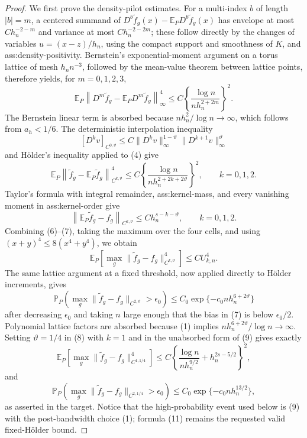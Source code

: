 \documentclass{article}
\begin{document}
\begin{proof}
We first prove the density-pilot estimates.  For a multi-index \(b\) of length \(|b|=m\), a centered summand of
\(D^b\widetilde f_g(x)-\mathbb E_PD^b\widetilde f_g(x)\) has envelope at most
\(C h_n^{-2-m}\) and variance at most \(C h_n^{-2-2m}\); these follow directly by the changes of variables
\(u=(x-z)/h_n\), using the compact support and smoothness of \(K\), and ass:density-positivity.  Bernstein's exponential-moment argument on a torus lattice of mesh \(h_n n^{-3}\), followed by the mean-value theorem between lattice points, therefore yields, for \(m=0,1,2,3\),
\[
 \mathbb E_P\left\|D^m\widetilde f_g-
       \mathbb E_PD^m\widetilde f_g\right\|_\infty^4
 \leq C\left\{\frac{\log n}{n h_n^{2+2m}}\right\}^{2}.
\tag{4}
\]
The Bernstein linear term is absorbed because
\(n h_n^2/\log n\to\infty\), which follows from \(a_h<1/6\).  The deterministic interpolation inequality
\[
 [D^k v]_{C^{0,\vartheta}}
 \leq C\|D^k v\|_\infty^{1-\vartheta}
          \|D^{k+1}v\|_\infty^{\vartheta}
\tag{5}
\]
and H\"older's inequality applied to (4) give
\[
 \mathbb E_P\left\|\widetilde f_g-\mathbb E_P\widetilde f_g
                   \right\|_{C^{k,\vartheta}}^4
 \leq C\left\{\frac{\log n}
 {n h_n^{2+2k+2\vartheta}}\right\}^{2},
 \qquad k=0,1,2.
\tag{6}
\]
Taylor's formula with integral remainder, ass:kernel-mass, and every vanishing moment in ass:kernel-order give
\[
 \left\|\mathbb E_P\widetilde f_g-f_g\right\|_{C^{k,\vartheta}}
 \leq C h_n^{s-k-\vartheta},
 \qquad k=0,1,2.
\tag{7}
\]
Combining (6)--(7), taking the maximum over the four cells, and using
\((x+y)^4\leq8(x^4+y^4)\), we obtain
\[
 \mathbb E_P\left[\max_g
 \|\widetilde f_g-f_g\|_{C^{k,\vartheta}}^4\right]
 \leq C U_{k,n}^4.
\tag{8}
\]
The same lattice argument at a fixed threshold, now applied directly to H\"older increments, gives
\[
 \mathbb P_P\left(\max_g
 \|\widetilde f_g-f_g\|_{C^{2,\vartheta}}>\epsilon_0\right)
 \leq C_0\exp\{-c_0n h_n^{6+2\vartheta}\}
\tag{9}
\]
after decreasing \(\epsilon_0\) and taking \(n\) large enough that the bias in (7) is below \(\epsilon_0/2\).  Polynomial lattice factors are absorbed because (1) implies
\(n h_n^{6+2\vartheta}/\log n\to\infty\).  Setting \(\vartheta=1/4\) in (8) with \(k=1\) and in the unabsorbed form of (9) gives exactly
\[
 \mathbb E_P\left[\max_g
 \|\widetilde f_g-f_g\|_{C^{1,1/4}}^4\right]
 \leq C\left\{\frac{\log n}{n h_n^{9/2}}
                  +h_n^{2s-5/2}\right\}^{2},
\tag{10}
\]
and
\[
 \mathbb P_P\left(\max_g
 \|\widetilde f_g-f_g\|_{C^{2,1/4}}>\epsilon_0\right)
 \leq C_0\exp\{-c_0n h_n^{13/2}\},
\tag{11}
\]
as asserted in the target.  Notice that the high-probability event used below is (9) with the post-bandwidth choice (1); formula (11) remains the requested valid fixed-H\"older bound.


\end{proof}
\end{document}
